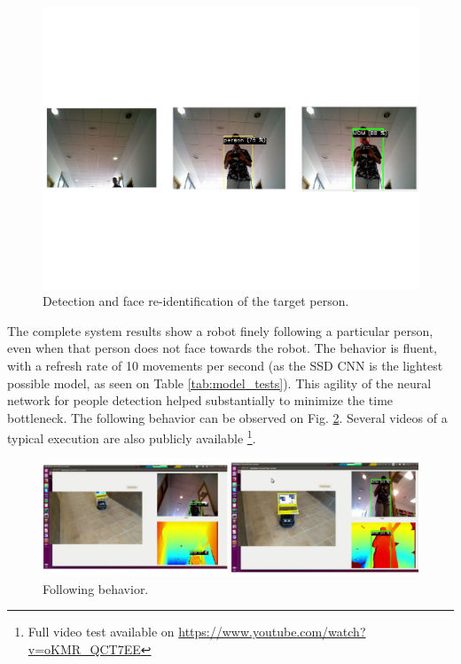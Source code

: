 \begin{figure}[h!]
	\centering
	\includegraphics[width=12cm]{images/exp_tracking}
	\caption{Detection and face re-identification of the target person.}
	\label{fig:exp_figures}
\end{figure}

The complete system results show a robot finely following a particular person, even when that person does not face towards the robot. The behavior is fluent, with a refresh rate of 10 movements per second (as the SSD CNN is the lightest possible model, as seen on Table \ref{tab:model_tests}). This agility of the neural network for people detection helped substantially to minimize the time bottleneck. The following behavior can be observed on Fig. \ref{fig:exp_following}. Several videos of a typical execution are also publicly available \footnote{Full video test available on \url{https://www.youtube.com/watch?v=oKMR_QCT7EE}}.

\begin{figure}[h!]
	\centering
	\includegraphics[width=12cm]{images/followperson_working2.png}
	\caption{Following behavior.}
	\label{fig:exp_following}
\end{figure}